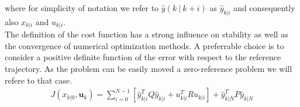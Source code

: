where for simplicity of notation we refer to $\hat{y}(k\ |\ k+i)$ as $\hat{y}_{k|i}$ and consequently also $x_{k|i}$ and $u_{k|i}$.\\
The definition of the cost function has a strong influence on stability as well as the convergence of numerical optimization methods. A preferrable choice is to consider a positive definite function of the error with respect to the reference trajectory. As the problem can be easily moved a zero-reference problem we will refere to that case. 
\begin{equation} \label{costfunction}
	\begin{split}
		J(x_{k|0},\textbf{u}_k) = \sum_{i=0}^{N-1} \left[\hat{y}_{k|i}^T Q \hat{y}_{k|i} + u_{k|i}^TRu_{k|i} \right] + \hat{y}_{k|N}^T P \hat{y}_{k|N}
	\end{split}	
\end{equation}

